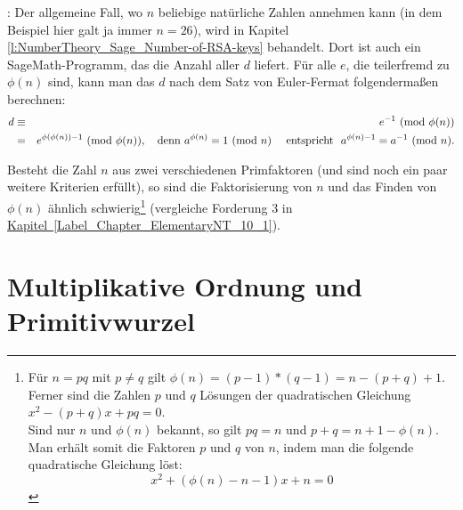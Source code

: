 \begin{refsegment}
\begin{example}{:}
Der allgemeine Fall, wo $n$ beliebige natürliche Zahlen annehmen kann (in
dem Beispiel hier galt ja immer $n = 26$), wird in Kapitel
\ref{l:NumberTheory_Sage_Number-of-RSA-keys} behandelt. Dort ist auch ein
SageMath-Programm, das die Anzahl aller $d$ liefert. Für alle $e$, die
teilerfremd zu $\phi(n)$ sind, kann man
das $d$ nach dem Satz von Euler-Fermat folgendermaßen berechnen:
\begin{eqnarray*}
 d & \equiv & e^{-1}      {\rm ~(mod~} \phi(n)) \nonumber\\
   & \equiv & e^{\phi(\phi(n))-1}  {\rm ~(mod~} \phi(n)), \quad  {\rm denn~}  a^{\phi(n)} \equiv 1 {\rm ~(mod~} n)
      \quad {\rm ~entspricht~~} a^{\phi(n)-1} \equiv a^{-1} {\rm ~(mod~} n). \nonumber
\end{eqnarray*}
\end{example}

Besteht die Zahl $n$ aus zwei verschiedenen Primfaktoren (und sind noch ein
paar weitere Kriterien erfüllt), so sind die Faktorisierung von $n$ und das Finden von $\phi(n)$ ähnlich schwierig\footnote{%
Für $n=pq$  mit $p\neq q$ gilt $ \phi(n) = (p-1)*(q-1)
= n -(p+q)+1.$ Ferner sind die Zahlen $p$ und $q$ Lösungen der quadratischen Gleichung
$x^2-(p+q)x+pq=0. $\\
Sind nur
$n$ und $\phi(n)$ bekannt, so gilt $pq=n$ und $p+q= n +1 -\phi(n).$  Man erhält somit die Faktoren $p$ und $q$ von $n$, indem man die folgende quadratische Gleichung löst:
$$ x^2 +(\phi(n)-n-1)x +n=0 $$\vspace{-\baselineskip}
}
(vergleiche Forderung 3 in \hyperlink{Chapter_ElementaryNT_10_1}
{Kapitel~\ref{Label_Chapter_ElementaryNT_10_1}}).



\hypertarget{Chapter_ElementaryNT_9}{}
\section[Multiplikative Ordnung und Primitivwurzel]
        {Multiplikative Ordnung und Primitivwurzel\footnotemark}
\label{MultOrdPrimitveRoot}


\end{refsegment}
